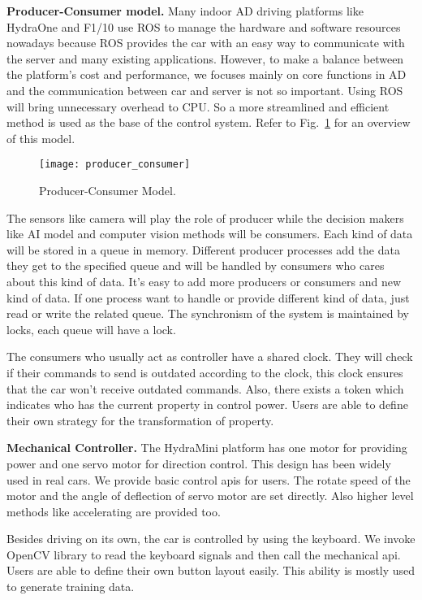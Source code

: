 \textbf{Producer-Consumer model.} Many indoor AD driving platforms like HydraOne\cite{wang2019hydraone} and F1/10\cite{o2019f1} use ROS\cite{quigley2009ros} to manage the hardware and software resources nowadays because ROS provides the car with an easy way to communicate with the server and many existing applications. However, to make a balance between the platform's cost and performance, we focuses mainly on core functions in AD and the communication between car and server is not so important. Using ROS will bring unnecessary overhead to CPU. So a more streamlined and efficient method is used as the base of the control system. Refer to Fig.~\ref{fig:producer_consumer} for an overview of this model.

\begin{figure}[t]
    \centering
    \texttt{[image: producer\_consumer]}
    \caption{Producer-Consumer Model.}
    \label{fig:producer_consumer}
\end{figure}

The sensors like camera will play the role of producer while the decision makers like AI model and computer vision methods will be consumers. Each kind of data will be stored in a queue in memory. Different producer processes add the data they get to the specified queue and will be handled by consumers who cares about this kind of data. It's easy to add more producers or consumers and new kind of data. If one process want to handle or provide different kind of data, just read or write the related queue. The synchronism of the system is maintained by locks, each queue will have a lock.

The consumers who usually act as controller have a shared clock. They will check if their commands to send is outdated according to the clock, this clock ensures that the car won't receive outdated commands. Also, there exists a token which indicates who has the current property in control power. Users are able to define their own strategy for the transformation of property.

\textbf{Mechanical Controller.} The HydraMini platform has one motor for providing power and one servo motor for direction control. This design has been widely used in real cars. We provide basic control apis for users. The rotate speed of the motor and the angle of deflection of servo motor are set directly. Also higher level methods like accelerating are provided too. 

Besides driving on its own, the car is controlled by using the keyboard. We invoke OpenCV\cite{opencv} library to read the keyboard signals and then call the mechanical api. Users are able to define their own button layout easily. This ability is mostly used to generate training data.

